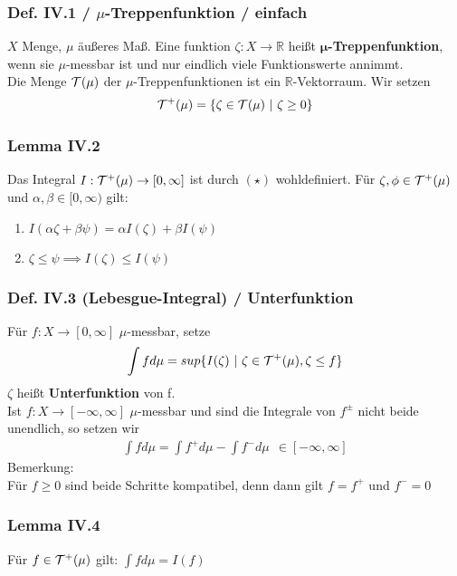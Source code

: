 
\begin{frame}
\frametitle{Def. IV.1 / $\mu$-Treppenfunktion / einfach}
$X$ Menge, $\mu$ äußeres Maß. Eine funktion $\zeta: X \to \mathbb{R}$ heißt $\bm{\mu}$\textbf{-Treppenfunktion}, wenn sie $\mu$-messbar ist und nur eindlich viele Funktionswerte annimmt.\\
    Die Menge $\mathcal{T}(\mu)$ der $\mu$-Treppenfunktionen ist ein $\mathbb{R}$-Vektorraum. Wir setzen
    \begin{align*}
      \mathcal{T}^+(\mu)=\{\zeta \in \mathcal{T}(\mu) \ | \ \zeta \geq 0\}
    \end{align*}
\end{frame}


\begin{frame}
\frametitle{Lemma IV.2}
Das Integral $I: \mathcal{T}^+(\mu) \to [0,\infty]$ ist durch $(\star)$ wohldefiniert. Für $\zeta, \phi \in \mathcal{T}^+(\mu)$ und $\alpha, \beta \in [0, \infty)$ gilt:
    \begin{enumerate}[label=\roman*)]
      \item $I(\alpha \zeta + \beta \psi) = \alpha I(\zeta) + \beta I(\psi)$
      \item $\zeta \leq \psi \implies I(\zeta) \leq I(\psi)$ 
    \end{enumerate}
\end{frame}


\begin{frame}
\frametitle{Def. IV.3 (Lebesgue-Integral) / Unterfunktion}
Für $f: X \to [0,\infty]$ $\mu$-messbar, setze
    \begin{align*}
      \int f d\mu = sup\{I(\zeta) \ | \ \zeta \in \mathcal{T}^+(\mu), \zeta \leq f\}
    \end{align*}
    $\zeta$ heißt \textbf{Unterfunktion} von f.\\
    Ist $f: X \to [-\infty, \infty]$ $\mu$-messbar und sind die Integrale von $f^{\pm}$ nicht beide unendlich, so setzen wir
    \begin{align*}
      \int f d\mu = \int f^+ d\mu - \int f^- d\mu \ \ \in [-\infty, \infty] 
    \end{align*}
    \medskip
Bemerkung:\\
Für $f \geq 0$ sind beide Schritte kompatibel, denn dann gilt $f = f^+$ und $f^- = 0$
\end{frame}


\begin{frame}
\frametitle{Lemma IV.4}
Für $f \in \mathcal{T}^+(\mu)$ gilt: $\int f d\mu = I(f)$
\end{frame}


